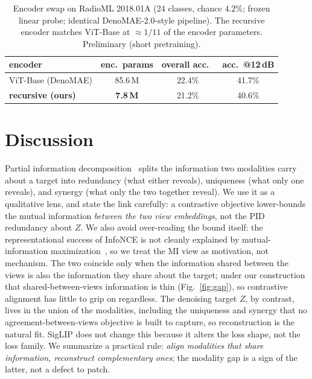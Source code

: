 \documentclass[conference]{IEEEtran}
\begin{document}
\begin{table}[t]
\centering
\caption{Encoder swap on RadioML 2018.01A (24 classes, chance $4.2\%$; frozen
linear probe; identical DenoMAE-2.0-style pipeline). The recursive encoder matches
ViT-Base at $\approx 1/11$ of the encoder parameters. Preliminary (short pretraining).}
\label{tab:rml}
\begin{tabular}{lccc}
\toprule
encoder & enc.\ params & overall acc.\ & acc.\ @12\,dB \\
\midrule
ViT-Base (DenoMAE) & 85.6\,M & 22.4\% & 41.7\% \\
\textbf{recursive (ours)} & \textbf{7.8\,M} & 21.2\% & 40.6\% \\
\bottomrule
\end{tabular}
\end{table}

\section{Discussion}
Partial information decomposition~\cite{pid} splits the information two modalities
carry about a target into redundancy (what either reveals), uniqueness (what only
one reveals), and synergy (what only the two together reveal). We use it as a
qualitative lens, and state the link carefully: a contrastive objective
lower-bounds the mutual information \emph{between the two view embeddings}, not the
PID redundancy about $Z$. We also avoid over-reading the bound itself: the
representational success of InfoNCE is not cleanly explained by mutual-information
maximization~\cite{tschannen}, so we treat the MI view as motivation, not mechanism.
The two coincide only when the information shared between
the views is also the information they share about the target; under our
construction that shared-between-views information is thin (Fig.~\ref{fig:gap}), so
contrastive alignment has little to grip on regardless. The denoising target $Z$,
by contrast, lives in the union of the modalities, including the uniqueness and
synergy that no agreement-between-views objective is built to capture, so
reconstruction is the natural fit. SigLIP does not change this because it alters
the loss shape, not the loss family. We summarize a practical rule: \emph{align
modalities that share information, reconstruct complementary ones}; the modality
gap is a sign of the latter, not a defect to patch.
\end{document}
